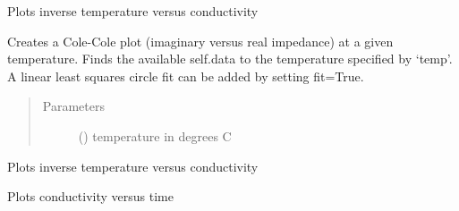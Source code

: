 \documentclass[letterpaper,10pt,english]{sphinxmanual}
\begin{document}
\begin{fulllineitems}
\begin{fulllineitems}
\label{\detokenize{source/laboratory.utils:laboratory.utils.plotting.LabPlots.arrhenius}}
Plots inverse temperature versus conductivity

\end{fulllineitems}


\begin{fulllineitems}
\label{\detokenize{source/laboratory.utils:laboratory.utils.plotting.LabPlots.cole}}
Creates a Cole-Cole plot (imaginary versus real impedance) at a given temperature. Finds the available self.data to the temperature specified by ‘temp’. A linear least squares circle fit can be added by setting fit=True.
\begin{quote}\begin{description}
\item[{Parameters}] \leavevmode
{} () \textendash{} temperature in degrees C

\end{description}\end{quote}

\end{fulllineitems}


\begin{fulllineitems}
\label{\detokenize{source/laboratory.utils:laboratory.utils.plotting.LabPlots.cond_fugacity}}
Plots inverse temperature versus conductivity

\end{fulllineitems}


\begin{fulllineitems}
\label{\detokenize{source/laboratory.utils:laboratory.utils.plotting.LabPlots.cond_time}}
Plots conductivity versus time


\end{fulllineitems}
\end{fulllineitems}
\end{document}
